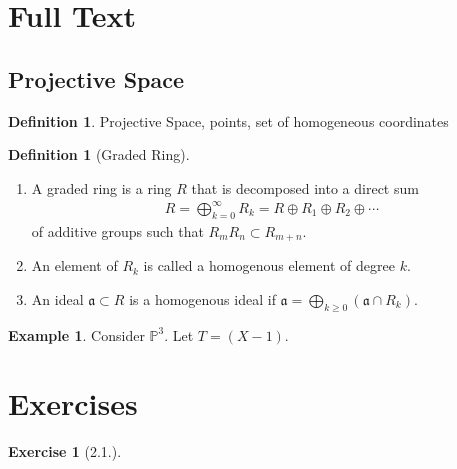 \documentclass[11pt]{book}
\newtheorem{exercise}{Exercise}[section]
\theoremstyle{definition}
\newtheorem{definition}[theorem]{Definition}
\newtheorem{example}[theorem]{Example}
\numberwithin{equation}{section}
\begin{document}
\section{Full Text}

\subsection{Projective Space}
\begin{defbox}
    \begin{definition}
        Projective Space, points, set of homogeneous coordinates
    \end{definition}
\end{defbox}
\begin{defbox}
    \begin{definition}[Graded Ring]
        \begin{enumerate}
            \item A graded ring is a ring \(R\) that is decomposed into a direct sum
            \begin{align*}
                R = \bigoplus_{k=0}^\infty R_k = R \oplus R_1 \oplus R_2 \oplus \cdots
            \end{align*}
            of additive groups such that \(R_m R_n \subset R_{m+n}\).
            \item An element of \(R_k\) is called a homogenous element of degree \(k\).
            \item An ideal \(\mathfrak{a} \subset R\) is a homogenous ideal if \(\mathfrak{a} = \bigoplus_{k \geq 0}(\mathfrak{a} \cap R_k)\).
        \end{enumerate}

    \end{definition}
\end{defbox}

\begin{example}
    Consider \(\mathbb{P}^3\). Let \(T = (X - 1)\).
\end{example}

\newpage
\section{Exercises}
\begin{exercise}[2.1.]
    
\end{exercise}
\end{document}
